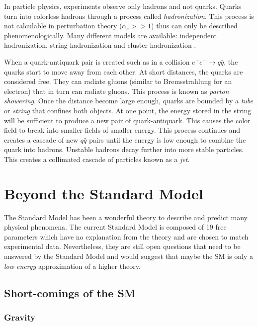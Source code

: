 In particle physics, experiments observe only hadrons and not quarks. Quarks turn into colorless hadrons through a process called \textit{hadronization}. This process is not calculable in perturbation theory ($\alpha_s >> 1$) thus can only be described phenomenologically. Many different models are available: independent hadronization, string hadronization \cite{Artru1988} and cluster hadronization \cite{Webber:1983if}.

When a quark-antiquark pair is created such as in a collision $e^+e^- \rightarrow q\bar{q}$, the quarks start to move away from each other. At short distances, the quarks are considered free. They can radiate gluons (similar to Bremsstrahlung for an electron) that in turn can radiate gluons. This process is known as \textit{parton showering}. Once the distance become large enough, quarks are bounded by a \textit{tube} or \textit{string} that confines both objects. At one point, the energy stored in the string will be sufficient to produce a new pair of quark-antiquark. This causes the color field to break into smaller fields of smaller energy. This process continues and creates a cascade of new $q\bar{q}$ pairs until the energy is low enough to combine the quark into hadrons. Unstable hadrons decay further into more stable particles. This creates a collimated cascade of particles known as a \textit{jet}.

\section{Beyond the Standard Model}
\label{sec:BeyondSM}

The Standard Model has been a wonderful theory to describe and predict many physical phenomena. The current Standard Model is composed of 19 free parameters which have no explanation from the theory and are chosen to match experimental data. Nevertheless, they are still open questions that need to be answered by the Standard Model and would suggest that maybe the SM is only a \textit{low energy} approximation of a higher theory.

\subsection{Short-comings of the SM}

\subsubsection*{Gravity}

